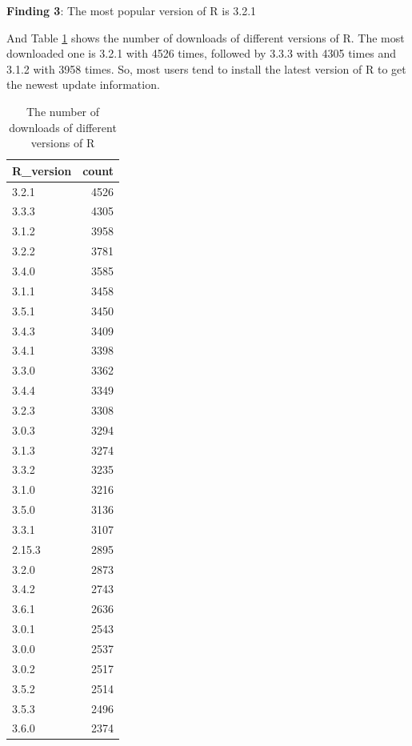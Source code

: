 \documentclass[
]{book}
\newenvironment{discovery}[1]{%
  \begin{tcolorbox}[colback=blue!30,colframe=blue!80!black]#1}{\end{tcolorbox}}
\begin{document}
\begin{discovery}
\textbf{Finding 3}: The most popular version of R is 3.2.1
\end{discovery}

And Table \ref{tab:R-download-trend-version} shows the number of downloads of different versions of R. The most downloaded one is 3.2.1 with 4526 times, followed by 3.3.3 with 4305 times and 3.1.2 with 3958 times. So, most users tend to install the latest version of R to get the newest update information.

\begin{table}

\caption{\label{tab:R-download-trend-version}The number of downloads of different versions of R}
\centering
\begin{tabular}[t]{l|r}
\hline
R\_version & count\\
\hline
3.2.1 & 4526\\
\hline
3.3.3 & 4305\\
\hline
3.1.2 & 3958\\
\hline
3.2.2 & 3781\\
\hline
3.4.0 & 3585\\
\hline
3.1.1 & 3458\\
\hline
3.5.1 & 3450\\
\hline
3.4.3 & 3409\\
\hline
3.4.1 & 3398\\
\hline
3.3.0 & 3362\\
\hline
3.4.4 & 3349\\
\hline
3.2.3 & 3308\\
\hline
3.0.3 & 3294\\
\hline
3.1.3 & 3274\\
\hline
3.3.2 & 3235\\
\hline
3.1.0 & 3216\\
\hline
3.5.0 & 3136\\
\hline
3.3.1 & 3107\\
\hline
2.15.3 & 2895\\
\hline
3.2.0 & 2873\\
\hline
3.4.2 & 2743\\
\hline
3.6.1 & 2636\\
\hline
3.0.1 & 2543\\
\hline
3.0.0 & 2537\\
\hline
3.0.2 & 2517\\
\hline
3.5.2 & 2514\\
\hline
3.5.3 & 2496\\
\hline
3.6.0 & 2374\\

\end{tabular}
\end{table}
\end{document}

